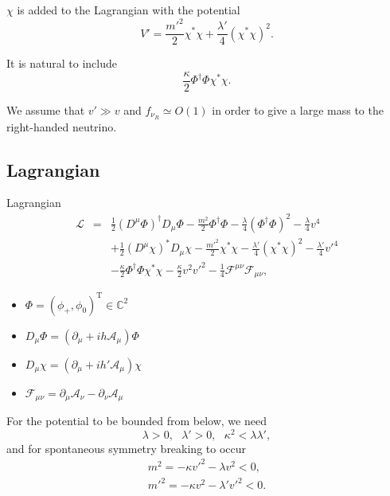 \documentclass[14pt]{beamer}
\begin{document}
\begin{frame}

$\chi$ is added to the Lagrangian with the potential
$$V' = \frac{m'^{2}}{2}\chi^*\chi+\frac{\lambda'}{4}(\chi^*\chi)^2.$$ 

It is natural to include  
$$ \frac{\kappa}{2}\Phi^{\dagger}\Phi\chi^*\chi.$$

We assume that $v'\gg v$ and $f_{\nu_R}\simeq O(1)$ in order to give a large mass to the right-handed neutrino.
\end{frame}

\subsection{Lagrangian}
\begin{frame}{Lagrangian}
\begin{eqnarray*} 
\mathcal{L} & = & \frac{1}{2}(D^{\mu}\Phi)^{\dagger}D_{\mu}\Phi - \frac{m^2}{2}\Phi^{\dagger}\Phi - \frac{\lambda}{4}(\Phi^{\dagger}\Phi)^2 -\frac{\lambda}{4}v^4   \nonumber\\
 & & +\frac{1}{2}(D^{\mu} \chi)^*D_{\mu} \chi - \frac{m'^2}{2}\chi^*\chi - \frac{\lambda'}{4}(\chi^* \chi)^2 -\frac{\lambda'}{4}v'^4\nonumber \\ 
 & & -\frac{\kappa}{2}\Phi^\dagger\Phi\chi^*\chi  -\frac{\kappa}{2}v^2v'^2 -\frac{1}{4}\mathcal{F}^{\mu\nu}\mathcal{F}_{\mu\nu}, %
\end{eqnarray*}

\begin{itemize}
	\item $\Phi = (\phi_+,\phi_0)^{\text{T}} \in \mathbb{C}^2$
	\item $D_{\mu} \Phi = (\partial_{\mu} + ih\mathcal{A}_{\mu})\Phi$
	\item $D_{\mu} \chi = (\partial_{\mu} + ih'\mathcal{A}_{\mu})\chi$
	\item $\mathcal{F}_{\mu\nu}= \partial_{\mu}\mathcal{A}_{\nu}-\partial_{\nu}\mathcal{A}_{\mu}$
\end{itemize}
\end{frame}

\begin{frame}
For the potential to be bounded from below, we need
\begin{equation*}
	\lambda>0, \ \ \ \lambda'>0, \ \ \ \kappa^2 < \lambda \lambda',
\end{equation*}
and for spontaneous symmetry breaking to occur
\begin{eqnarray*}
 m^2 = -\kappa v'^2 - \lambda v^2<0,\\
  m'^2 = -\kappa v^2 - \lambda' v'^2<0.
\end{eqnarray*}



\end{frame}
\end{document}
